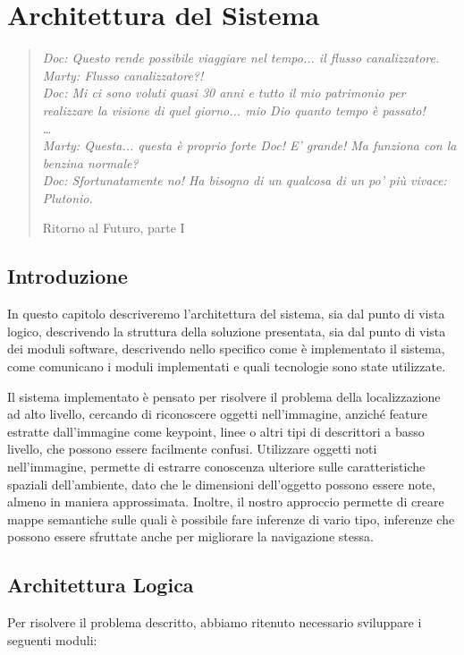 \chapter{Architettura del Sistema}
\label{cap:architettura}
\thispagestyle{empty}

\begin{quotation}
{\footnotesize
\noindent \emph{Doc: Questo rende possibile viaggiare nel tempo... il flusso canalizzatore.
Marty: Flusso canalizzatore?! \\
Doc: Mi ci sono voluti quasi 30 anni e tutto il mio patrimonio per realizzare la visione di quel giorno... mio Dio quanto tempo è passato! \\
\dots \\
Marty: Questa... questa è proprio forte Doc! E' grande! Ma funziona con la benzina normale? \\
Doc: Sfortunatamente no! Ha bisogno di un qualcosa di un po' più vivace: Plutonio.
}
\begin{flushright}
Ritorno al Futuro, parte I
\end{flushright}
}
\end{quotation}
\vspace{0.5cm}

\section{Introduzione}
In questo capitolo descriveremo l'architettura del sistema, sia dal punto di vista logico, descrivendo la struttura della soluzione presentata, sia dal punto di vista dei moduli software, descrivendo nello specifico come è implementato il sistema, come comunicano i moduli implementati e quali tecnologie sono state utilizzate.

Il sistema implementato è pensato per risolvere il problema della localizzazione ad alto livello, cercando di riconoscere oggetti nell'immagine, anziché feature estratte dall'immagine come keypoint, linee o altri tipi di descrittori a basso livello, che possono essere facilmente confusi. Utilizzare oggetti noti nell'immagine, permette di estrarre conoscenza ulteriore sulle caratteristiche spaziali dell'ambiente, dato che le dimensioni dell'oggetto possono essere note, almeno in maniera approssimata. Inoltre, il nostro approccio permette di creare mappe semantiche sulle quali è possibile fare inferenze di vario tipo, inferenze che possono essere sfruttate anche per migliorare la navigazione stessa.

\section{Architettura Logica}
Per risolvere il problema descritto, abbiamo ritenuto necessario sviluppare i seguenti moduli:

